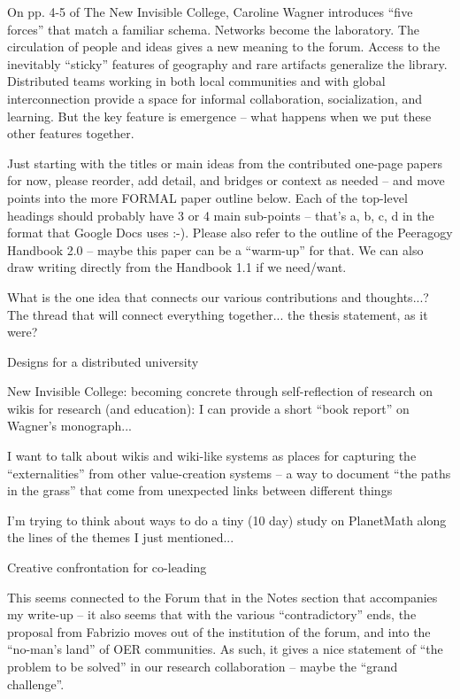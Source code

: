 \documentclass{acm_proc_article-sp}
\begin{document}
On pp. 4-5 of The New Invisible College, Caroline Wagner introduces ``five forces'' that match a familiar schema. Networks become the laboratory. The circulation of people and ideas gives a new meaning to the forum. Access to the inevitably ``sticky'' features of geography and rare artifacts generalize the library. Distributed teams working in both local communities and with global interconnection provide a space for informal collaboration, socialization, and learning. But the key feature is emergence -- what happens when we put these other features together.

Just starting with the titles or main ideas from the contributed one-page papers for now, please reorder, add detail, and bridges or context as needed -- and move points into the more FORMAL paper outline below. Each of the top-level headings should probably have 3 or 4 main sub-points -- that's a, b, c, d in the format that Google Docs uses :-). Please also refer to the outline of the Peeragogy Handbook 2.0 -- maybe this paper can be a ``warm-up'' for that. We can also draw writing directly from the Handbook 1.1 if we need/want.

        What is the one idea that connects our various contributions and thoughts...? The thread that will connect everything together... the thesis statement, as it were?

    Designs for a distributed university

        New Invisible College: becoming concrete through self-reflection of research on wikis for research (and education): I can provide a short ``book report'' on Wagner's monograph...

        I want to talk about wikis and wiki-like systems as places for capturing the ``externalities'' from other value-creation systems -- a way to document ``the paths in the grass'' that come from unexpected links between different things

        I'm trying to think about ways to do a tiny (10 day) study on PlanetMath along the lines of the themes I just mentioned...

    Creative confrontation for co-leading

        This seems connected to the Forum that in the Notes section that accompanies my write-up -- it also seems that with the various ``contradictory'' ends, the proposal from Fabrizio moves out of the institution of the forum, and into the ``no-man's land'' of OER communities. As such, it gives a nice statement of ``the problem to be solved'' in our research collaboration -- maybe the ``grand challenge''.
\end{document}
